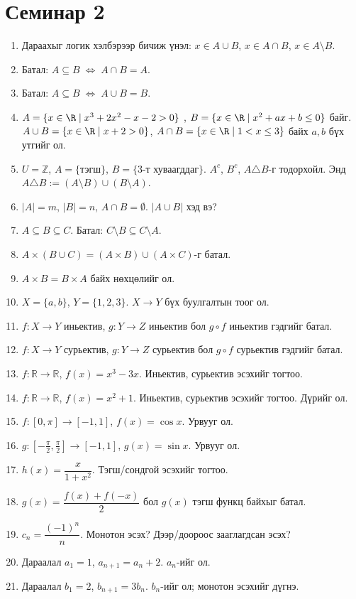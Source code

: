 \section{Семинар 2}
\begin{enumerate}
  \item Дараахыг логик хэлбэрээр бичиж үнэл: $x\in A\cup B$, $x\in A\cap B$, $x\in A\setminus B$.
  \item Батал: $A\subseteq B\;\Leftrightarrow\;A\cap B=A$.
  \item Батал: $A\subseteq B\;\Leftrightarrow\;A\cup B=B$.
  \item $A=\{x\in\R\mid x^3+2x^2-x-2>0\}$ , $B=\{x\in\R\mid x^2+ax+b\leq 0\}$ байг. $A\cup B=\{x\in\R\mid x+2>0\}$,  $A\cap B=\{x\in\R\mid 1<x\leq 3\}$ байх $a,b$ бүх утгийг ол.
  \item $U=\mathbb{Z}$, $A=\{\text{тэгш}\}$, $B=\{\text{3-т хуваагддаг}\}$. $A^c$, $B^c$, $A\triangle B$-г тодорхойл. Энд $A\triangle B:= (A\setminus B)\cup (B\setminus A)$.
  \item $|A|=m$, $|B|=n$, $A\cap B=\emptyset$. $|A\cup B|$ хэд вэ?
  \item $A\subseteq B\subseteq C$. Батал: $C\setminus B\subseteq C\setminus A$.
  \item $A\times(B\cup C)=(A\times B)\cup(A\times C)$-г батал.
  \item $A\times B=B\times A$ байх нөхцөлийг ол.
  \item $X=\{a,b\}$, $Y=\{1,2,3\}$. $X\to Y$ бүх буулгалтын тоог ол.
  \item $f:X\to Y$ иньектив, $g:Y\to Z$ иньектив бол $g\circ f$ иньектив гэдгийг батал.
  \item $f:X\to Y$ сурьектив, $g:Y\to Z$ сурьектив бол $g\circ f$ сурьектив гэдгийг батал.
  \item $f:\mathbb{R}\to\mathbb{R}$, $f(x)=x^3-3x$. Иньектив, сурьектив эсэхийг тогтоо.
  \item $f:\mathbb{R}\to\mathbb{R}$, $f(x)=x^2+1$. Иньектив, сурьектив эсэхийг тогтоо. Дүрийг ол.
  \item $f:[0,\pi]\to[-1,1]$, $f(x)=\cos x$. Урвууг ол.
  \item $g:[-\tfrac{\pi}{2},\tfrac{\pi}{2}]\to[-1,1]$, $g(x)=\sin x$. Урвууг ол.
  \item $h(x)=\dfrac{x}{1+x^2}$. Тэгш/сондгой эсэхийг тогтоо.
  \item $g(x)=\dfrac{f(x)+f(-x)}{2}$ бол $g(x)$ тэгш функц байхыг батал.
  \item $c_n=\dfrac{(-1)^n}{n}$. Монотон эсэх? Дээр/доороос зааглагдсан эсэх?
  \item Дараалал $a_1=1$, $a_{n+1}=a_n+2$. $a_n$-ийг ол.
  \item Дараалал $b_1=2$, $b_{n+1}=3b_n$. $b_n$-ийг ол; монотон эсэхийг дүгнэ.
\end{enumerate}
\newpage
